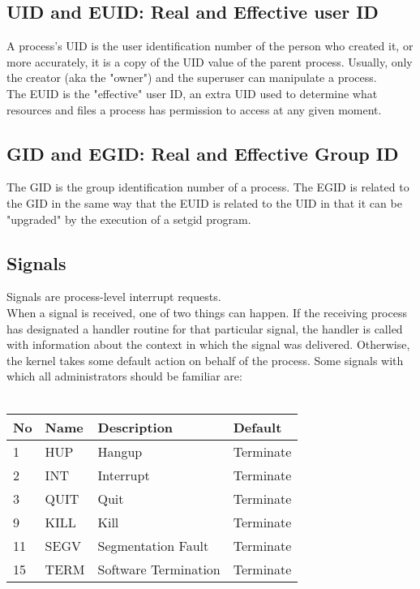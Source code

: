 \documentclass[10pt,letterpaper]{book}
\begin{document}
\subsection{UID and EUID: Real and Effective user ID}
A process's UID is the user identification number of the person who created it, or
more accurately, it is a copy of the UID value of the parent process. Usually, only
the creator (aka the "owner") and the superuser can manipulate a process.\\
The EUID is the "effective" user ID, an extra UID used to determine what resources and files a process has permission to access at any given moment.
\subsection{GID and EGID: Real and Effective Group ID}
The GID is the group identification number of a process. The EGID is related to
the GID in the same way that the EUID is related to the UID in that it can be
"upgraded" by the execution of a setgid program.
\subsection{Signals}
Signals are process-level interrupt requests.\\
When a signal is received, one of two things can happen. If the receiving process
has designated a handler routine for that particular signal, the handler is called
with information about the context in which the signal was delivered. Otherwise,
the kernel takes some default action on behalf of the process.
Some signals with which all administrators should be familiar are:\\
\\
\begin{tabular}{l l l l}
\hline
\textbf{No} & \textbf{Name} & \textbf{Description} & \textbf{Default}\\
\hline 
1 & HUP & Hangup & Terminate\\
2 & INT & Interrupt & Terminate\\
3 & QUIT & Quit & Terminate\\
9 & KILL & Kill & Terminate\\
11 & SEGV & Segmentation Fault & Terminate\\
15 & TERM & Software Termination & Terminate\\
\hline
\end{tabular}
\end{document}
